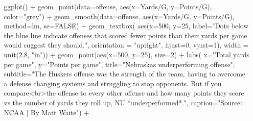 \documentclass[
  letterpaper,
  DIV=11,
  numbers=noendperiod]{scrreprt}
\newenvironment{Shaded}{\begin{snugshade}}{\end{snugshade}}
\newcommand{\AttributeTok}[1]{\textcolor[rgb]{0.40,0.45,0.13}{#1}}
\newcommand{\ConstantTok}[1]{\textcolor[rgb]{0.56,0.35,0.01}{#1}}
\newcommand{\DecValTok}[1]{\textcolor[rgb]{0.68,0.00,0.00}{#1}}
\newcommand{\FloatTok}[1]{\textcolor[rgb]{0.68,0.00,0.00}{#1}}
\newcommand{\FunctionTok}[1]{\textcolor[rgb]{0.28,0.35,0.67}{#1}}
\newcommand{\NormalTok}[1]{\textcolor[rgb]{0.00,0.23,0.31}{#1}}
\newcommand{\SpecialCharTok}[1]{\textcolor[rgb]{0.37,0.37,0.37}{#1}}
\newcommand{\StringTok}[1]{\textcolor[rgb]{0.13,0.47,0.30}{#1}}
\begin{document}
\begin{Shaded}
\begin{Highlighting}[]
\FunctionTok{ggplot}\NormalTok{() }\SpecialCharTok{+} 
  \FunctionTok{geom\_point}\NormalTok{(}\AttributeTok{data=}\NormalTok{offense, }\FunctionTok{aes}\NormalTok{(}\AttributeTok{x=}\StringTok{\textasciigrave{}}\AttributeTok{Yards/G}\StringTok{\textasciigrave{}}\NormalTok{, }\AttributeTok{y=}\StringTok{\textasciigrave{}}\AttributeTok{Points/G}\StringTok{\textasciigrave{}}\NormalTok{), }\AttributeTok{color=}\StringTok{"grey"}\NormalTok{) }\SpecialCharTok{+} 
  \FunctionTok{geom\_smooth}\NormalTok{(}\AttributeTok{data=}\NormalTok{offense, }\FunctionTok{aes}\NormalTok{(}\AttributeTok{x=}\StringTok{\textasciigrave{}}\AttributeTok{Yards/G}\StringTok{\textasciigrave{}}\NormalTok{, }\AttributeTok{y=}\StringTok{\textasciigrave{}}\AttributeTok{Points/G}\StringTok{\textasciigrave{}}\NormalTok{), }\AttributeTok{method=}\NormalTok{lm, }\AttributeTok{se=}\ConstantTok{FALSE}\NormalTok{) }\SpecialCharTok{+} 
  \FunctionTok{geom\_textbox}\NormalTok{(}
    \FunctionTok{aes}\NormalTok{(}\AttributeTok{x=}\DecValTok{500}\NormalTok{, }
        \AttributeTok{y=}\DecValTok{25}\NormalTok{, }
        \AttributeTok{label=}\StringTok{"Dots below the blue line indicate offenses that scored fewer points than their yards per game would suggest they should."}\NormalTok{, }
        \AttributeTok{orientation =} \StringTok{"upright"}\NormalTok{, }
        \AttributeTok{hjust=}\DecValTok{0}\NormalTok{, }
        \AttributeTok{vjust=}\DecValTok{1}\NormalTok{), }\AttributeTok{width =} \FunctionTok{unit}\NormalTok{(}\FloatTok{2.8}\NormalTok{, }\StringTok{"in"}\NormalTok{)) }\SpecialCharTok{+}
  \FunctionTok{geom\_point}\NormalTok{(}\FunctionTok{aes}\NormalTok{(}\AttributeTok{x=}\DecValTok{500}\NormalTok{, }\AttributeTok{y=}\DecValTok{25}\NormalTok{), }\AttributeTok{size=}\DecValTok{2}\NormalTok{) }\SpecialCharTok{+} 
  \FunctionTok{labs}\NormalTok{(}
    \AttributeTok{x=}\StringTok{"Total yards per game"}\NormalTok{, }
    \AttributeTok{y=}\StringTok{"Points per game"}\NormalTok{, }
    \AttributeTok{title=}\StringTok{"Nebraska\textquotesingle{}s underperforming offense"}\NormalTok{, }
    \AttributeTok{subtitle=}\StringTok{"The Husker\textquotesingle{}s offense was the strength of the team, having to overcome a defense changing systems and struggling to stop opponents. But if you compare\textless{}br\textgreater{}the offense to every other offense and how many points they score vs the number of yards they roll up, NU *underperformed*."}\NormalTok{, }
    \AttributeTok{caption=}\StringTok{"Source: NCAA | By Matt Waite"}\NormalTok{) }\SpecialCharTok{+} 

\end{Highlighting}
\end{Shaded}
\end{document}
